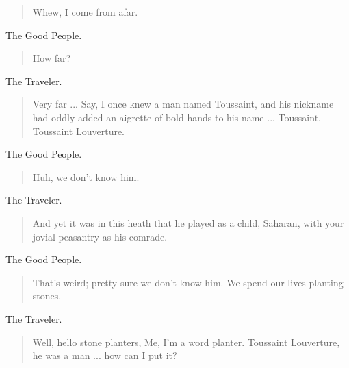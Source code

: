 \documentclass[letterpaper,article,12pt,oneside,notitlepage]{memoir}
\begin{document}
\begin{verse}
Whew, I come from afar. \\
\end{verse}

\begin{center}The Good People.\end{center}

\begin{verse}
How far? \\
\end{verse}

\begin{center}The Traveler.\end{center}

\begin{verse}
Very far ... Say, I once knew a man named Toussaint, and his nickname had oddly added an aigrette of bold hands to his name ... Toussaint, Toussaint Louverture. \\
\end{verse}

\begin{center}The Good People.\end{center}

\begin{verse}
Huh, we don't know him. \\
\end{verse}

\begin{center}The Traveler.\end{center}

\begin{verse}
And yet it was in this heath that he played as a child, Saharan, with your jovial peasantry as his comrade. \\
\end{verse}

\begin{center}The Good People.\end{center}

\begin{verse}
That's weird; pretty sure we don't know him. We spend our lives planting stones. \\
\end{verse}

\begin{center}The Traveler.\end{center}

\begin{verse}
Well, hello stone planters, Me, I'm a word planter. Toussaint Louverture, he was a man ... how can I put it? \\
\end{verse}
\end{document}
